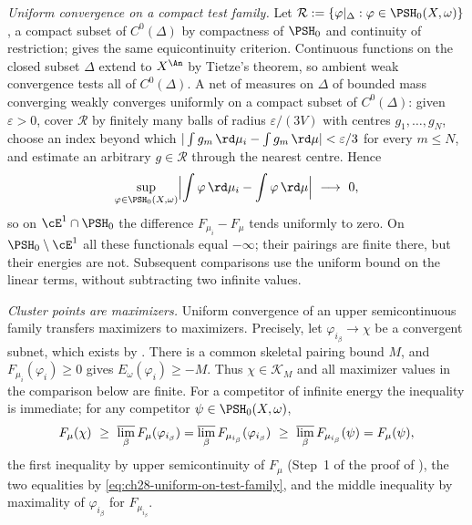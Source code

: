 \emph{Uniform convergence on a compact test family.}  Let
$\mathcal R:=\{\varphi|_\Delta:\varphi\in\PSH_0(X,\omega)\}$, a compact
subset of $C^0(\Delta)$ by compactness of $\PSH_0$ and continuity
of restriction;  gives the same
equicontinuity criterion.  Continuous functions on the closed subset
$\Delta$ extend to $X^{\An}$ by Tietze's theorem, so ambient weak
convergence tests all of $C^0(\Delta)$.  A net of
measures on $\Delta$ of bounded mass converging weakly converges uniformly
on a compact subset of $C^0(\Delta)$: given $\varepsilon>0$, cover
$\mathcal R$ by finitely many balls of radius $\varepsilon/(3V)$ with
centres $g_1,\ldots,g_N$, choose an index beyond which
$|\int g_m\,\rd\mu_i-\int g_m\,\rd\mu|<\varepsilon/3$ for every
$m\leq N$, and estimate an arbitrary $g\in\mathcal R$ through the
nearest centre.  Hence
\begin{equation}
\label{eq:ch28-uniform-on-test-family}
 \sup_{\varphi\in\PSH_0(X,\omega)}
 \Bigl|\int\varphi\,\rd\mu_i-\int\varphi\,\rd\mu\Bigr|
 \ \longrightarrow\ 0 ,
\end{equation}
so on $\cE^1\cap\PSH_0$ the difference
$F_{\mu_i}-F_\mu$ tends uniformly to zero.  On
$\PSH_0\setminus\cE^1$ all these functionals equal $-\infty$; their
pairings are finite there, but their energies are not.  Subsequent
comparisons use the uniform bound on the linear terms, without
subtracting two infinite values.

\emph{Cluster points are maximizers.}  Uniform convergence of an upper
semicontinuous family transfers maximizers to maximizers.  Precisely, let
$\varphi_{i_\beta}\to\chi$ be a convergent subnet, which exists by
.  There is a common skeletal pairing
bound $M$, and $F_{\mu_i}(\varphi_i)\geq0$ gives
$E_\omega(\varphi_i)\geq-M$.  Thus $\chi\in\mathcal K_M$ and all
maximizer values in the comparison below are finite.
For a competitor of infinite energy the inequality is immediate;
for any competitor
$\psi\in\PSH_0(X,\omega)$,
\[
 F_\mu(\chi)\ \geq\ \varlimsup_\beta F_{\mu}(\varphi_{i_\beta})
 =\varlimsup_\beta F_{\mu_{i_\beta}}(\varphi_{i_\beta})
 \ \geq\ \varlimsup_\beta F_{\mu_{i_\beta}}(\psi)=F_\mu(\psi),
\]
the first inequality by upper semicontinuity of $F_\mu$
(Step~1 of the proof of ), the two
equalities by \eqref{eq:ch28-uniform-on-test-family}, and the middle
inequality by maximality of $\varphi_{i_\beta}$ for $F_{\mu_{i_\beta}}$.

